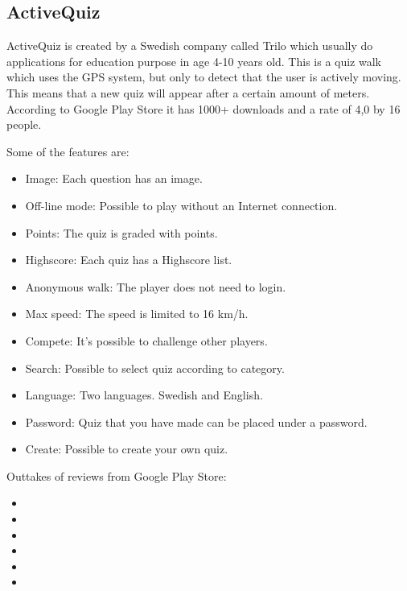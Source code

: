 \documentclass{TDP003mall}
\begin{document}
\subsection{ActiveQuiz}
ActiveQuiz is created by a Swedish company called Trilo which usually do applications for
education purpose in age 4-10 years old. This is a quiz walk which uses the GPS system, but only
to detect that the user is actively moving. This means that a new quiz will appear after a certain
amount of meters. According to Google Play Store it has 1000+ downloads and a rate of 4,0 by 16 people.

Some of the features are:
\begin{itemize}
	\item Image: Each question has an image.
	\item Off-line mode: Possible to play without an Internet connection.
	\item Points: The quiz is graded with points.
	\item Highscore: Each quiz has a Highscore list.
	\item Anonymous walk: The player does not need to login.
	\item Max speed: The speed is limited to 16 km/h.
	\item Compete: It's possible to challenge other players.
	\item Search: Possible to select quiz according to category.
	\item Language: Two languages. Swedish and English.
	\item Password: Quiz that you have made can be placed under a password.
	\item Create: Possible to create your own quiz.
\end{itemize}

Outtakes of reviews from Google Play Store:
\begin{itemize}
	\item {}
	\item {}
	\item {}
	\item {}
	\item {}
	\item {}
\end{itemize}
\end{document}
